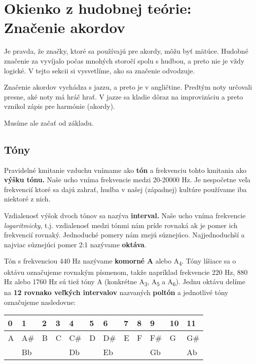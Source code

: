 \begingroup %
\setlength{\parindent}{0pt}
\setlength{\parskip}{\baselineskip}
\large
\def\arraystretch{1.5}%


\section*{Okienko z hudobnej teórie: Značenie akordov}

Je pravda, že značky, ktoré sa používajú pre akordy, môžu byť mätúce. Hudobné
značenie za vyvíjalo počas mnohých storočí spolu s hudbou, a preto nie je
vždy logické. V tejto sekcii si vysvetlíme, ako sa značenie odvodzuje.

Značenie akordov vychádza s jazzu, a preto je v angličtine. Predtým noty určovali
presne, aké noty má hráč hrať. V jazze sa kladie dôraz na improvizáciu a preto vznikol
zápis pre harmónie (akordy).

Musíme ale začať od základu.


\subsection*{Tóny}

Pravidelné kmitanie vzduchu vnímame ako \textbf{tón} a frekvenciu tohto kmitania ako
\textbf{výšku tónu.} Naše ucho vníma frekvencie medzi 20-20000 Hz. Je nespočetne veľa
frekvencií ktoré sa dajú zahrať, hudba v našej (západnej) kultúre používame iba niektoré
z nich.

Vzdialenosť výšok dvoch tónov sa nazýva \textbf{interval.} Naše ucho vníma frekvencie \textit{logaritmicky},
t.j. vzdialenosť medzi tónmi nám príde rovnaká ak je pomer ich frekvencií rovnaký. Jednoduché pomery nám
znejú súznejúco. Najjednoduchší a najviac súznejúci pomer 2:1 nazývame \textbf{oktáva}.

Tón s frekvenciou 440 Hz nazývame \textbf{komorné A} alebo A\textsubscript{4}. Tóny líšiace sa
o oktávu označujeme rovnakým písmenom, takže napríklad frekvencie 220 Hz, 880 Hz alebo 1760 Hz sú tiež tóny A
(konkrétne A\textsubscript{3}, A\textsubscript{5} a A\textsubscript{6}). Jednu oktávu delíme na
\textbf{12 rovnako veľkých intervalov} nazvaných \textbf{poltón} a jednotlivé tóny označujeme nasledovne:

\begin{center}
\begin{tabular}{ C{2em} C{2em} C{2em} C{2em} C{2em} C{2em} C{2em} C{2em} C{2em} C{2em} C{2em} C{2em} }
    0 & 1   & 2 & 3 & 4   & 5 & 6   & 7 & 8 & 9   & 10 & 11 \\
    \hline
    A & A\# & B & C & C\# & D & D\# & E & F & F\# & G & G\# \\
      & Bb  &   &   & Db  &   & Eb  &   &   & Gb  &   & Ab  \\
\end{tabular}
\end{center}

